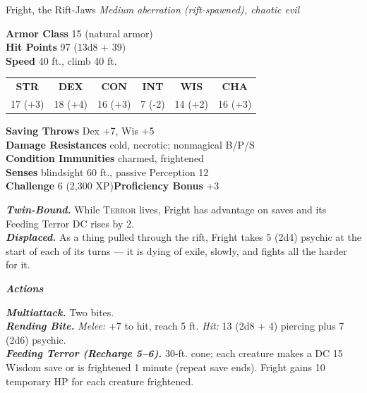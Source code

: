 \documentclass[10pt,twoside]{article}
\newcommand{\abilities}[6]{%
\begin{center}\small
\setlength{\tabcolsep}{6pt}\renewcommand{\arraystretch}{1.05}
\begin{tabular}{cccccc}
\textbf{STR}&\textbf{DEX}&\textbf{CON}&\textbf{INT}&\textbf{WIS}&\textbf{CHA}\\[1pt]
#1&#2&#3&#4&#5&#6\\
\end{tabular}\end{center}}
\newcommand{\sbrule}{\par\vspace{2pt}\noindent{\color{bloodred}\rule{\linewidth}{1.1pt}}\par\vspace{2pt}}
\newcommand{\eqname}[1]{\textsc{#1}}
\begin{document}
\begin{statblock}{Fright, the Rift-Jaws}
\textit{Medium aberration (rift-spawned), chaotic evil}\sbrule
\textbf{Armor Class} 15 (natural armor)\\
\textbf{Hit Points} 97 (13d8 + 39)\\
\textbf{Speed} 40 ft., climb 40 ft.\sbrule
\abilities{17 (+3)}{18 (+4)}{16 (+3)}{7 (-2)}{14 (+2)}{16 (+3)}
\sbrule
\textbf{Saving Throws} Dex +7, Wis +5\\
\textbf{Damage Resistances} cold, necrotic; nonmagical B/P/S\\
\textbf{Condition Immunities} charmed, frightened\\
\textbf{Senses} blindsight 60 ft., passive Perception 12\\
\textbf{Challenge} 6 (2,300 XP)\hfill\textbf{Proficiency Bonus} +3\sbrule
\textbf{\textit{Twin-Bound.}} While \eqname{Terror} lives, Fright has advantage on
saves and its Feeding Terror DC rises by 2.\\
\textbf{\textit{Displaced.}} As a thing pulled through the rift, Fright takes 5 (2d4)
psychic at the start of each of its turns --- it is dying of exile, slowly, and fights
all the harder for it.\sbrule
\textit{\textbf{Actions}}\par
\textbf{\textit{Multiattack.}} Two bites.\\
\textbf{\textit{Rending Bite.}} \textit{Melee:} +7 to hit, reach 5 ft. \textit{Hit:}
13 (2d8 + 4) piercing plus 7 (2d6) psychic.\\
\textbf{\textit{Feeding Terror (Recharge 5--6).}} 30-ft. cone; each creature makes a
DC 15 Wisdom save or is frightened 1 minute (repeat save ends). Fright gains 10
temporary HP for each creature frightened.
\end{statblock}
\end{document}
